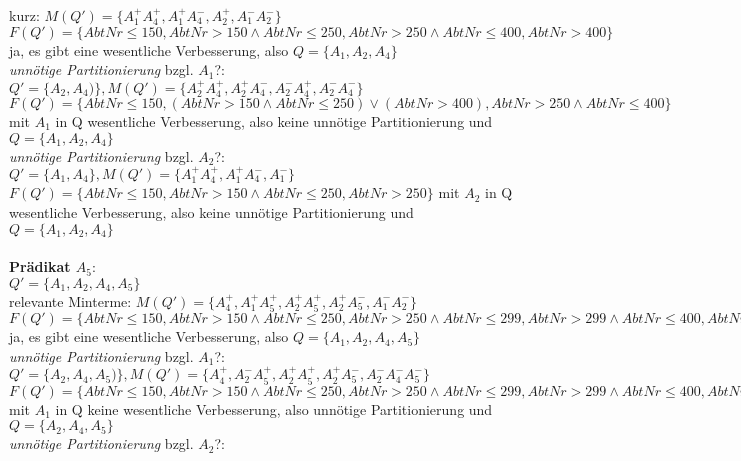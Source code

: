 \documentclass[a4paper]{article}
\begin{document}
kurz: $ M(Q') = \{ A_1^+ A_4^+, A_1^+ A_4^-, A_2^+, A_1^- A_2^-\} $\\
$ F(Q') = \{ AbtNr\leq 150, AbtNr >150 \wedge AbtNr \leq 250, AbtNr>250 \wedge AbtNr \leq 400, AbtNr > 400 \} $\\
ja, es gibt eine wesentliche Verbesserung, also $ Q = \{ A_1, A_2, A_4 \} $ \\
\textit{unnötige Partitionierung} bzgl. $ A_1 $?: \\
$ Q' = \{A_2, A_4) \}, M(Q') = \{ A_2^+ A_4^+, A_2^+ A_4^-, A_2^- A_4^+, A_2^- A_4^- \} $\\
$ F(Q') = \{ AbtNr\leq 150, (AbtNr >150 \wedge AbtNr \leq 250) \vee (AbtNr > 400), AbtNr>250 \wedge AbtNr \leq 400 \} $
mit $ A_1 $ in Q wesentliche Verbesserung, also keine unnötige Partitionierung und $ Q = \{ A_1, A_2, A_4 \} $\\
\textit{unnötige Partitionierung} bzgl. $ A_2 $?: \\
$ Q' = \{A_1, A_4 \}, M(Q') = \{ A_1^+ A_4^+, A_1^+ A_4^-, A_1^-\} $\\
$ F(Q') = \{ AbtNr\leq 150, AbtNr >150 \wedge AbtNr \leq 250, AbtNr >250 \} $
mit $ A_2 $ in Q wesentliche Verbesserung, also keine unnötige Partitionierung und $ Q = \{ A_1, A_2, A_4 \} $\\
\\
\textbf{Prädikat $ A_5 $}:\\
$ Q' = \{ A_1, A_2, A_4, A_5 \} $\\
relevante Minterme: $ M(Q') = \{ A_4^+, A_1^+ A_5^+, A_2^+ A_5^+, A_2^+ A_5^-, A_1^- A_2^- \} $\\
$ F(Q') = \{ AbtNr\leq 150, AbtNr >150 \wedge AbtNr \leq 250, AbtNr>250 \wedge AbtNr \leq 299, AbtNr >299 \wedge AbtNr \leq 400, AbtNr > 400 \} $\\
ja, es gibt eine wesentliche Verbesserung, also $ Q = \{ A_1, A_2, A_4, A_5 \} $ \\
\textit{unnötige Partitionierung} bzgl. $ A_1 $?: \\
$ Q' = \{A_2, A_4, A_5) \}, M(Q') = \{ A_4^+, A_2^- A_5^+, A_2^+ A_5^+, A_2^+ A_5^-, A_2^- A_4^- A_5^- \} $\\
$ F(Q') = \{ AbtNr\leq 150, AbtNr >150 \wedge AbtNr \leq 250, AbtNr>250 \wedge AbtNr \leq 299, AbtNr >299 \wedge AbtNr \leq 400, AbtNr > 400 \} $
mit $ A_1 $ in Q keine wesentliche Verbesserung, also unnötige Partitionierung und $ Q = \{ A_2, A_4, A_5 \} $\\
\textit{unnötige Partitionierung} bzgl. $ A_2 $?: \\
\end{document}
